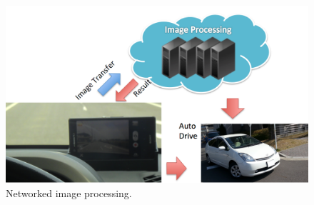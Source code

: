 \begin{figure}[!t]
 \centering
 \includegraphics[width=\hsize]{fig/TIPIC.pdf}
 \caption{Networked image processing.}
 \label{fig:tipic}
\end{figure}
